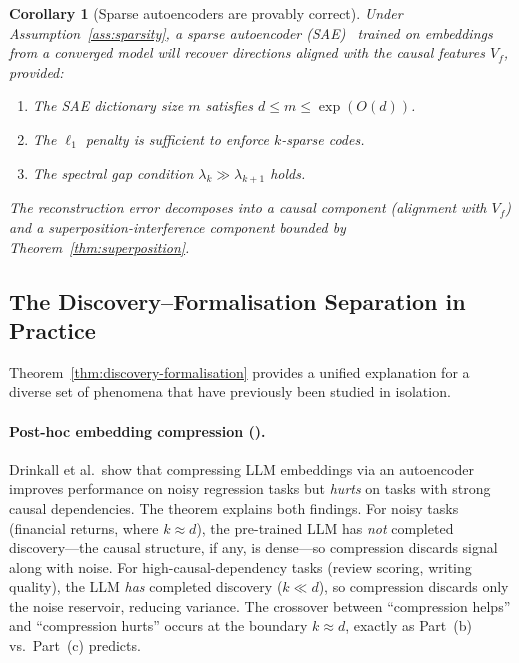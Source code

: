 \documentclass[11pt,a4paper]{article}
\theoremstyle{plain}
\newtheorem{corollary}[theorem]{Corollary}
\theoremstyle{definition}
\theoremstyle{remark}
\begin{document}
\begin{corollary}[Sparse autoencoders are provably correct]%
\label{cor:sae}
Under Assumption~\ref{ass:sparsity}, a sparse autoencoder
(SAE)~\citep{bricken2023monosemanticity} trained on embeddings from a converged
model will recover directions aligned with the causal features $V_f$, provided:
\begin{enumerate}[label=\textup{(\alph*)}]
  \item The SAE dictionary size $m$ satisfies $d \leq m \leq \exp(O(d))$.
  \item The $\ell_1$ penalty is sufficient to enforce $k$-sparse codes.
  \item The spectral gap condition $\lambda_k \gg \lambda_{k+1}$ holds.
\end{enumerate}
The reconstruction error decomposes into a causal component (alignment with
$V_f$) and a superposition-interference component bounded by
Theorem~\ref{thm:superposition}.
\end{corollary}


\subsection{The Discovery--Formalisation Separation in Practice}%
\label{sec:disc-form-connections}

Theorem~\ref{thm:discovery-formalisation} provides a unified explanation for a
diverse set of phenomena that have previously been studied in isolation.

\paragraph{Post-hoc embedding compression
\textnormal{(\citealt{drinkall2025dimensionality})}.}
Drinkall et al.\ show that compressing LLM embeddings via an autoencoder
improves performance on noisy regression tasks but \emph{hurts} on tasks with
strong causal dependencies.  The theorem explains both findings.  For noisy tasks
(financial returns, where $k \approx d$), the pre-trained LLM has \emph{not}
completed discovery---the causal structure, if any, is dense---so compression
discards signal along with noise.  For high-causal-dependency tasks (review
scoring, writing quality), the LLM \emph{has} completed discovery ($k \ll d$),
so compression discards only the noise reservoir, reducing variance.  The
crossover between ``compression helps'' and ``compression hurts'' occurs at the
boundary $k \approx d$, exactly as Part~(b) vs.~Part~(c) predicts.
\end{document}
